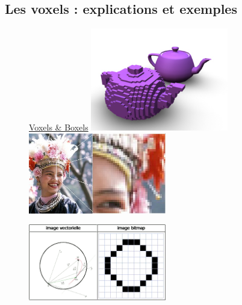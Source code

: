 \documentclass{beamer}
\begin{document}
\subsection{Les voxels : explications et exemples}
\begin{frame}
 \begin{center}
  \begin{figure}
   \Large \ul{Voxels \& Boxels}
   \includegraphics[width=6cm]{Images/Images_Alexis/voxel_teapot.jpg}
   \includegraphics[width=6cm]{Images/Images_Alexis/example_matricielle.jpg}
  \end{figure}
  \begin{figure}
   \includegraphics[width=6cm]{Images/Images_Alexis/comparaison_vecteur_matrice.png}
  \end{figure}
 \end{center}
\end{frame}
\end{document}
